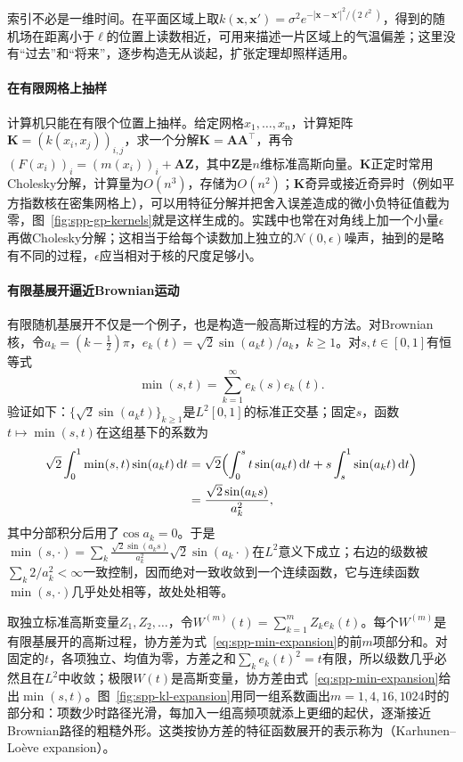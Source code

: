 索引不必是一维时间。在平面区域上取$k(\bm x,\bm x')=\sigma^2e^{-|\bm x-\bm x'|^2/(2\ell^2)}$，得到的随机场在距离小于$\ell$的位置上读数相近，可用来描述一片区域上的气温偏差；这里没有“过去”和“将来”，逐步构造无从谈起，扩张定理却照样适用。

\paragraph{在有限网格上抽样}
计算机只能在有限个位置上抽样。给定网格$x_1,\ldots,x_n$，计算矩阵$\bm K=(k(x_i,x_j))_{i,j}$，求一个分解$\bm K=\bm A\bm A^\top$，再令$(F(x_i))_i=(m(x_i))_i+\bm A\bm Z$，其中$\bm Z$是$n$维标准高斯向量。$\bm K$正定时常用Cholesky分解，计算量为$O(n^3)$，存储为$O(n^2)$；$\bm K$奇异或接近奇异时（例如平方指数核在密集网格上），可以用特征分解并把舍入误差造成的微小负特征值截为零，图~\ref{fig:spp-gp-kernels}就是这样生成的。实践中也常在对角线上加一个小量$\epsilon$再做Cholesky分解；这相当于给每个读数加上独立的$\mathcal N(0,\epsilon)$噪声，抽到的是略有不同的过程，$\epsilon$应当相对于核的尺度足够小。

\paragraph{有限基展开逼近Brownian运动}
有限随机基展开不仅是一个例子，也是构造一般高斯过程的方法。对Brownian核，令$a_k=(k-\tfrac12)\pi$，$e_k(t)=\sqrt2\sin(a_kt)/a_k$，$k\ge1$。对$s,t\in[0,1]$有恒等式
\begin{equation}
  \min(s,t)=\sum_{k=1}^\infty e_k(s)e_k(t) .
  \label{eq:spp-min-expansion}
\end{equation}
验证如下：$\{\sqrt2\sin(a_kt)\}_{k\ge1}$是$L^2[0,1]$的标准正交基；固定$s$，函数$t\mapsto\min(s,t)$在这组基下的系数为
\[
  \begin{aligned}
  \sqrt2\int_0^1\min(s,t)\sin(a_kt)\,\mathrm dt
  &=\sqrt2\Bigl(\int_0^st\sin(a_kt)\,\mathrm dt+s\int_s^1\sin(a_kt)\,\mathrm dt\Bigr)\\
  &=\frac{\sqrt2\sin(a_ks)}{a_k^2},
  \end{aligned}
\]
其中分部积分后用了$\cos a_k=0$。于是$\min(s,\cdot)=\sum_k\frac{\sqrt2\sin(a_ks)}{a_k^2}\sqrt2\sin(a_k\cdot)$在$L^2$意义下成立；右边的级数被$\sum_k2/a_k^2<\infty$一致控制，因而绝对一致收敛到一个连续函数，它与连续函数$\min(s,\cdot)$几乎处处相等，故处处相等。

取独立标准高斯变量$Z_1,Z_2,\ldots$，令$W^{(m)}(t)=\sum_{k=1}^mZ_ke_k(t)$。每个$W^{(m)}$是有限基展开的高斯过程，协方差为式~\eqref{eq:spp-min-expansion}的前$m$项部分和。对固定的$t$，各项独立、均值为零，方差之和$\sum_ke_k(t)^2=t$有限，所以级数几乎必然且在$L^2$中收敛；极限$W(t)$是高斯变量，协方差由式~\eqref{eq:spp-min-expansion}给出$\min(s,t)$。图~\ref{fig:spp-kl-expansion}用同一组系数画出$m=1,4,16,1024$时的部分和：项数少时路径光滑，每加入一组高频项就添上更细的起伏，逐渐接近Brownian路径的粗糙外形。这类按协方差的特征函数展开的表示称为（Karhunen--Loève expansion）。

